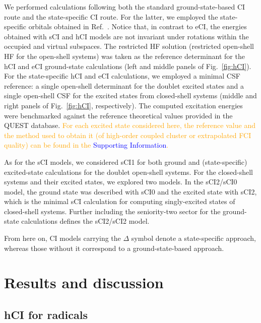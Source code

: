 \documentclass[aip,jcp,reprint,noshowkeys,superscriptaddress]{revtex4-1}
\newcommand{\fk}[1]{\textcolor{orange}{#1}}
\newcommand{\SupInf}{\textcolor{blue}{Supporting Information}}
\begin{document}
We performed calculations following both the standard ground-state-based CI route and the state-specific CI route. \cite{Kossoski_2023}
For the latter, we employed the state-specific orbitals obtained in Ref.~.
Notice that, in contrast to eCI, the energies obtained with sCI and hCI models are not invariant under rotations within the occupied and virtual subspaces.
The restricted HF solution (restricted open-shell HF for the open-shell systems) was taken as the reference determinant for the hCI and eCI ground-state calculations
(left and middle panels of Fig.~\ref{fig:hCI}).
For the state-specific hCI and eCI calculations, we employed a minimal CSF reference: \cite{Kossoski_2023}
a single open-shell determinant for the doublet excited states and a single open-shell CSF for the excited states from closed-shell systems
(middle and right panels of Fig.~\ref{fig:hCI}, respectively).
The computed excitation energies were benchmarked against the reference theoretical values provided in the QUEST database. \cite{Veril_2021}
\fk{For each excited state considered here, the reference value and the method used to obtain it (of high-order coupled cluster or extrapolated FCI quality) can be found in the {\SupInf}.}

As for the sCI models,
we considered sCI1 for both ground and (state-specific) excited-state calculations for the doublet open-shell systems.
For the closed-shell systems and their excited states, we explored two models.
In the sCI2/sCI0 model, the ground state was described with sCI0 and the excited state with sCI2, which is the minimal sCI calculation for computing singly-excited states of closed-shell systems.
Further including the seniority-two sector for the ground-state calculations defines the sCI2/sCI2 model.

From here on, CI models carrying the $\Delta$ symbol denote a state-specific approach, whereas those without it correspond to a ground-state-based approach.

\section{Results and discussion}
\label{sec:res}

\subsection{hCI for radicals}
\label{sec:res_A}
\end{document}
